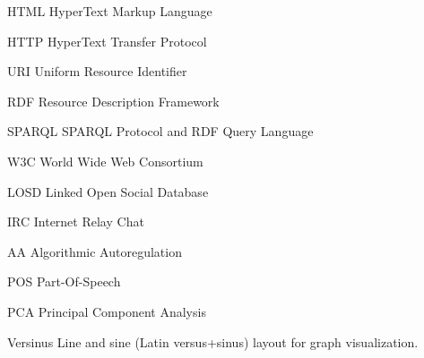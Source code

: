 \documentclass[
12pt,		%
openright,	%
twoside,  %
a4paper,			%
chapter=TITLE,		%
english,			%
french,				%
spanish,			%
brazil				%
]{USPSC}
\begin{document}
\listoffigures*
\cleardoublepage

\listoftables*
\cleardoublepage


\begin{siglas}
	\item[HTML] HyperText Markup Language
	\item[HTTP] HyperText Transfer Protocol
	\item[URI] Uniform Resource Identifier
	\item[RDF] Resource Description Framework
	\item[SPARQL] SPARQL Protocol and RDF Query Language
	\item[W3C] World Wide Web Consortium
	\item[LOSD] Linked Open Social Database
	\item[IRC] Internet Relay Chat
	\item[AA] Algorithmic Autoregulation
	\item[POS] Part-Of-Speech
	\item[PCA] Principal Component Analysis
	\item[Versinus] Line and sine (Latin versus+sinus) layout for graph visualization.
\end{siglas}
% 	
\end{document}
